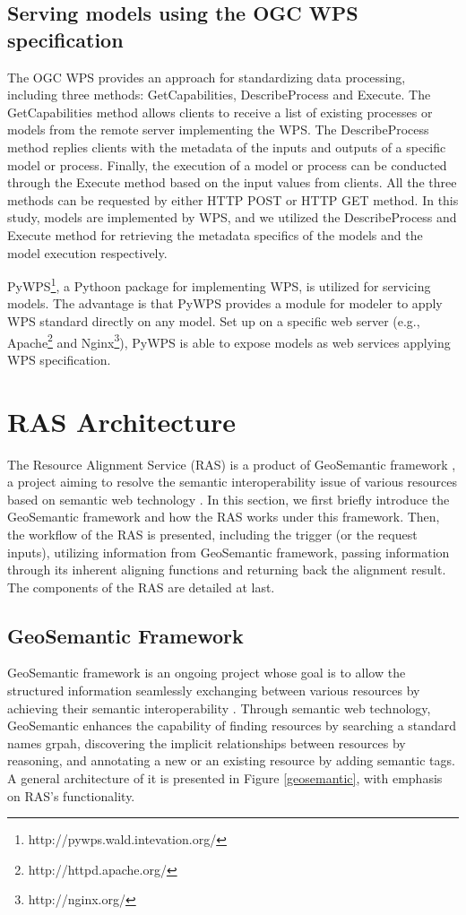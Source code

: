 \documentclass[review]{elsarticle}
\begin{document}
\subsection{Serving models using the OGC WPS specification} The OGC WPS provides an approach for standardizing data processing, including three methods: GetCapabilities, DescribeProcess and Execute. The GetCapabilities method allows clients to receive a list of existing processes or models from the remote server implementing the WPS. The DescribeProcess method replies clients with the metadata of the inputs and outputs of a specific model or process. Finally, the execution of a model or process can be conducted through the Execute method based on the input values from clients. All the three methods can be requested by either HTTP POST or HTTP GET method. In this study, models are implemented by WPS, and we utilized the DescribeProcess and Execute method for retrieving the metadata specifics of the models and the model execution respectively.

PyWPS\footnote{http://pywps.wald.intevation.org/}, a Pythoon package for implementing WPS, is utilized for servicing models. The advantage is that PyWPS provides a module for modeler to apply WPS standard directly on any model. Set up on a specific web server (e.g., Apache\footnote{http://httpd.apache.org/} and Nginx\footnote{http://nginx.org/}), PyWPS is able to expose models as web services applying WPS specification.


\section{RAS Architecture}The Resource Alignment Service (RAS) is a product of GeoSemantic framework \citep{elag2015}, a project aiming to resolve the semantic interoperability issue of various resources based on semantic web technology \citep{berners2001}. In this section, we first briefly introduce the GeoSemantic framework and how the RAS works under this framework. Then, the workflow of the RAS is presented, including the trigger (or the request inputs), utilizing information from GeoSemantic framework, passing information through its inherent aligning functions and returning back the alignment result. The components of the RAS are detailed at last.

\subsection{GeoSemantic Framework}GeoSemantic framework is an ongoing project whose goal is to allow the structured information seamlessly exchanging between various resources by achieving their semantic interoperability \citep{elag2015}. Through semantic web technology, GeoSemantic enhances the capability of finding resources by searching a standard names grpah, discovering the implicit relationships between resources by reasoning, and annotating a new or an existing resource by adding semantic tags. A general architecture of it is presented in Figure \ref{geosemantic}, with emphasis on RAS's functionality.
\end{document}
